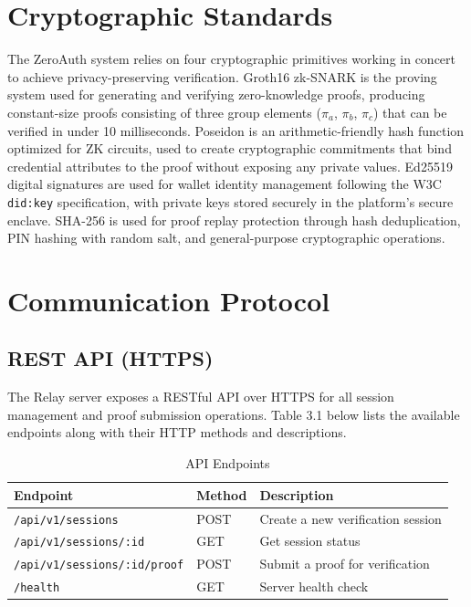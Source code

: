 \section{Cryptographic Standards}

The ZeroAuth system relies on four cryptographic primitives working in concert to achieve privacy-preserving verification. Groth16 zk-SNARK is the proving system used for generating and verifying zero-knowledge proofs, producing constant-size proofs consisting of three group elements ($\pi_a$, $\pi_b$, $\pi_c$) that can be verified in under 10 milliseconds. Poseidon is an arithmetic-friendly hash function optimized for ZK circuits, used to create cryptographic commitments that bind credential attributes to the proof without exposing any private values. Ed25519 digital signatures are used for wallet identity management following the W3C \texttt{did:key} specification, with private keys stored securely in the platform's secure enclave. SHA-256 is used for proof replay protection through hash deduplication, PIN hashing with random salt, and general-purpose cryptographic operations.

\section{Communication Protocol}

\subsection{REST API (HTTPS)}

The Relay server exposes a RESTful API over HTTPS for all session management and proof submission operations. Table 3.1 below lists the available endpoints along with their HTTP methods and descriptions.

\begin{table}[H]
\centering
\caption{API Endpoints}
\begin{tabular}{|l|l|l|}
\hline
\textbf{Endpoint} & \textbf{Method} & \textbf{Description} \\
\hline
\texttt{/api/v1/sessions} & POST & Create a new verification session \\
\texttt{/api/v1/sessions/:id} & GET & Get session status \\
\texttt{/api/v1/sessions/:id/proof} & POST & Submit a proof for verification \\
\texttt{/health} & GET & Server health check \\
\hline
\end{tabular}
\end{table}

